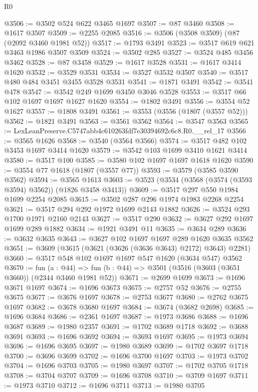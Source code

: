 \begin{lexlean}{R0}
\begin{coremodule}
@3506 := @3502 @524 @622 @3465 @1697
@3507 := @87 @3460
@3508 := @1617 @3507
@3509 := @2255 @2085
@3516 := @3506 (@3508 @3509) (@87 (@2092 @3460 @1981 @52))
@3517 := @1793 @3491
@3523 := @3517 @619 @621 @3463 @1986 @3507 @3509
@3524 := @3502 @285
@3527 := @3524 @485 @3456 @3462
@3528 := @87 @3458
@3529 := @1617 @3528
@3531 := @1617 @3414 @1620
@3532 := @3529 @3531
@3534 := @3527 @3532 @3507
@3540 := @3517 @480 @484 @3451 @3455 @3528 @3531
@3541 := @1871 @3491
@3542 := @3541 @478
@3547 := @3542 @249 @1699 @3450 @3046 @3528
@3553 := @3517 @66 @102 @1697 @1697 @1627 @1620
@3554 := @1802 @3491
@3556 := @3554 @52 @1627
@3557 := @1808 @3491
@3561 := @3553 (@3556 (@1807 (@3557 @52)))
@3562 := @1821 @3491
@3563 := @3561 @3562
@3564 := @3547 @3563
@3565 := LexLeanPreserve.C5747abb4c610263fdf7e30394692c6c8.R0.__rel_17
@3566 := @3565 @1626
@3568 := @3540 (@3564 @3566)
@3574 := @3517 @482 @102 @3453 @1697 @3414 @1620
@3579 := @3542 @103 @1699 @3410 @1621 @3414
@3580 := @3517 @100
@3585 := @3580 @102 @1697 @1697 @1618 @1620
@3590 := @3554 @77 @1618 (@1807 (@3557 @77))
@3593 := @3579 (@3585 @3590 @3562)
@3594 := @3565 @1613
@3603 := @3523 (@3534 (@3568 (@3574 (@3593 @3594) @3562)) (@1826 @3458 @3413))
@3609 := @3517 @297 @550 @1984 @1699 @2254 @2085
@3615 := @3502 @287 @296 @1974 @1983 @2268 @2254
@3621 := @3517 @294 @292 @1972 @1699 @2143 @1882
@3626 := @3524 @293 @1700 @1971 @2160 @2143
@3627 := @3517 @290
@3632 := @3627 @292 @1697 @1699 @289 @1882
@3634 := @1921 @3491 @11
@3635 := @3634 @289
@3636 := @3632 @3635
@3643 := @3627 @102 @1697 @1697 @289 @1620 @3635 @3562
@3651 := @3609 (@3615 (@3621 (@3626 (@3636 @3643) @2172) @3643) @2281)
@3660 := @3517 @548 @102 @1697 @1697 @547 @1620 (@3634 @547) @3562
@3670 := fun (a : @44) =>
  fun (b : @44) => @3501 (@3516 (@3603 (@3651 @3660)) (@2344 @3460 @1981 @52))
@3671 := @2699 @1699
@3673 := @1696 @3671 @1697
@3674 := @1696 @3673
@3675 := @2757 @52
@3676 := @2755 @3675
@3677 := @3676 @1697
@3678 := @2753 @3677
@3680 := @2762 @3675 @1697
@3682 := @3678 @3680 @1697
@3684 := @3674 (@3682 @2698)
@3685 := @1696 @3684
@3686 := @2361 @1697
@3687 := @1973 @3686
@3688 := @1696 @3687
@3689 := @1980 @2357
@3691 := @1702 @3689 @1718
@3692 := @3688 @3691
@3693 := @1696 @3692
@3694 := @3693 @1697
@3695 := @1973 @3694
@3696 := @1696 @3695
@3697 := @1980 @3689
@3699 := @1702 @3697 @1718
@3700 := @3696 @3699
@3702 := @1696 @3700 @1697
@3703 := @1973 @3702
@3704 := @1696 @3703
@3705 := @1980 @3697
@3707 := @1702 @3705 @1718
@3708 := @3704 @3707
@3709 := @1696 @3708
@3710 := @3709 @1697
@3711 := @1973 @3710
@3712 := @1696 @3711
@3713 := @1980 @3705

\end{coremodule}
\end{lexlean}
